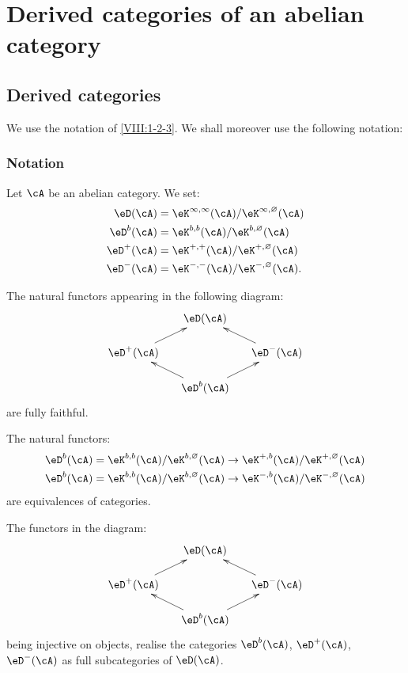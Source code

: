 \section{Derived categories of an abelian category}\label{VIII:3}





\subsection{Derived categories}\label{VIII:3-1}

We use the notation of \ref{VIII:1-2-3}. We shall moreover use the
following notation:

\subsubsection{Notation}\label{VIII:3-1-1}

Let $\cA$ be an abelian category. We set: 
\begin{align*}
  \eD(\cA) &= \eK^{\infty,\infty}(\cA)/\eK^{\infty,\varnothing}(\cA) \\
  \eD^b(\cA) &= \eK^{b,b}(\cA)/\eK^{b,\varnothing}(\cA) \\
  \eD^+(\cA) &= \eK^{+,+}(\cA) / \eK^{+,\varnothing}(\cA) \\
  \eD^-(\cA) &= \eK^{-,-}(\cA) / \eK^{-,\varnothing}(\cA) \text{.}
\end{align*}





\begin{proposition}\label{VIII:3-1-2}
The natural functors appearing in the following diagram:
\[\xymatrix@=0.5cm{
  & \eD(\cA) \\
  \eD^+(\cA) \ar[ur]
    & & \eD^-(\cA) \ar[ul] \\
  & \eD^b(\cA) \ar[ul] \ar[ur]
}\]
are fully faithful.

The natural functors: 
\begin{align*}
  \eD^b(\cA) &= \eK^{b,b}(\cA)/\eK^{b,\varnothing}(\cA) \to \eK^{+,b}(\cA)/\eK^{+,\varnothing}(\cA) \\
  \eD^b(\cA) &= \eK^{b,b}(\cA)/\eK^{b,\varnothing}(\cA) \to \eK^{-,b}(\cA) / \eK^{-,\varnothing}(\cA) 
\end{align*}
are equivalences of categories.

The functors in the diagram: 
\[\xymatrix@=0.5cm{
  & \eD(\cA) \\
  \eD^+(\cA) \ar[ur] 
    & & \eD^-(\cA) \ar[ul] \\
  & \eD^b(\cA) \ar[ul] \ar[ur]
}\]
being injective on objects, realise the categories $\eD^b(\cA)$,
$\eD^+(\cA)$, $\eD^-(\cA)$ as full subcategories of $\eD(\cA)$.
\end{proposition}


